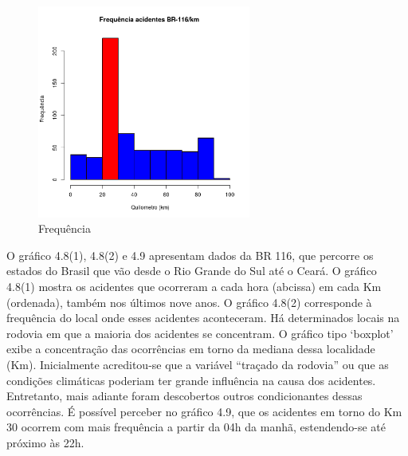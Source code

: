 \quad \quad
\begin{figure}[h]
	\centering
	\caption{ Frequência}
	\includegraphics[width=7cm,height=7cm]{Figuras/Preprocess/br116_3.png}
\end{figure}

O gráfico 4.8(1), 4.8(2)  e 4.9 apresentam dados da BR 116, que percorre os estados do Brasil que vão desde o Rio Grande do Sul até o Ceará. O gráfico 4.8(1) mostra os acidentes que ocorreram a cada hora (abcissa) em cada Km (ordenada), também nos últimos nove anos. 
O  gráfico 4.8(2) corresponde à frequência do local onde esses acidentes aconteceram. Há determinados locais na rodovia em que a maioria dos acidentes se concentram. 
O gráfico tipo ‘boxplot’ exibe a concentração das ocorrências em torno da mediana dessa localidade (Km). 
Inicialmente acreditou-se que a variável “traçado da rodovia” ou que as condições climáticas poderiam ter grande influência na causa dos acidentes. Entretanto, mais adiante foram descobertos outros condicionantes dessas ocorrências. 
É possível perceber no gráfico 4.9, que os acidentes em torno do Km 30 ocorrem com mais frequência a partir da 04h da manhã, estendendo-se até próximo às 22h. 

\pagebreak

